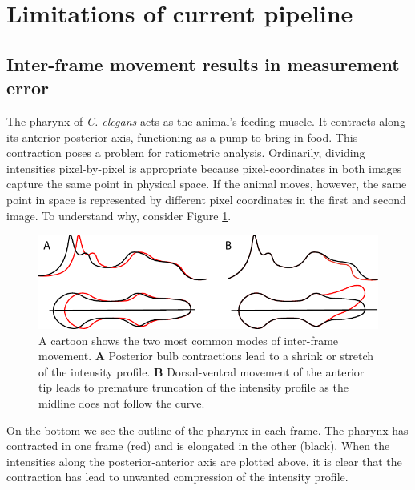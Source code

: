 \section{Limitations of current pipeline} \label{limitations}
\subsection{Inter-frame movement results in measurement error} \label{limitationMovement}

The pharynx of \textit{C. elegans} acts as the animal's feeding muscle. It contracts along its anterior-posterior axis, functioning as a pump to bring in food. This contraction poses a problem for ratiometric analysis. Ordinarily, dividing intensities pixel-by-pixel is appropriate because pixel-coordinates in both images capture the same point in physical space. If the animal moves, however, the same point in space is represented by different pixel coordinates in the first and second image. To understand  why, consider Figure \ref{fig:MovementCartoon}.


\begin{figure}[ht]
    \centering
    \includegraphics{Figures/rendered_files/movement_cartoon}
    \decoRule
    \caption[Pharyngeal contractions lead to boundary issues]{A cartoon shows the two most common modes of inter-frame movement. \textbf{A} Posterior bulb contractions lead to a shrink or stretch of the intensity profile. \textbf{B} Dorsal-ventral movement of the anterior tip leads to premature truncation of the intensity profile as the midline does not follow the curve.}
    \label{fig:MovementCartoon}
\end{figure}

On the bottom we see the outline of the pharynx in each frame. The pharynx has contracted in one frame (red) and is elongated in the other (black). When the intensities along the posterior-anterior axis are plotted above, it is clear that the contraction has lead to unwanted compression of the intensity profile.

